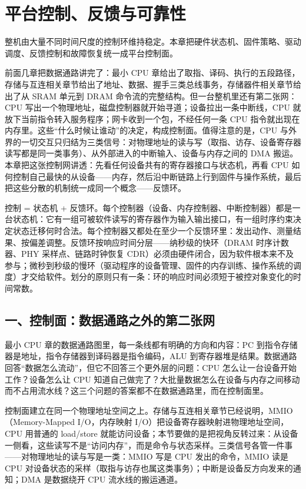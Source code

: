\chapter{平台控制、反馈与可靠性}

\begin{keyidea}
整机由大量不同时间尺度的控制环维持稳定。本章把硬件状态机、固件策略、驱动调度、反馈控制和故障恢复统一成平台控制面。
\end{keyidea}

前面几章把数据通路讲完了：最小 CPU 章给出了取指、译码、执行的五段路径，存储与互连相关章节给出了地址、数据、握手三类总线事务，存储器件相关章节给出了从 SRAM 单元到 DRAM 命令流的完整结构。但一台整机里还有第二张网：CPU 写出一个物理地址，磁盘控制器就开始寻道；设备拉出一条中断线，CPU 就放下当前指令转入服务程序；网卡收到一个包，不经任何一条 CPU 指令就出现在内存里。这些“什么时候让谁动”的决定，构成控制面。值得注意的是，CPU 与外界的一切交互只归结为三类信号：对物理地址的读与写（取指、访存、设备寄存器读写都是同一类事务）、从外部进入的中断输入、设备与内存之间的 DMA 搬运。本章把这张控制网讲透：先看任何设备共有的寄存器接口与状态机，再看 CPU 如何控制自己最快的从设备——内存，然后沿中断链路上行到固件与操作系统，最后把这些分散的机制统一成同一个概念——反馈环。

\begin{keyidea}
控制 = 状态机 + 反馈环。每个控制器（设备、内存控制器、中断控制器）都是一台状态机：它有一组可被软件读写的寄存器作为输入输出接口，有一组时序约束决定状态迁移何时合法。每个控制器又都处在至少一个反馈环里：发出动作、测量结果、按偏差调整。反馈环按响应时间分层——纳秒级的快环（DRAM 时序计数器、PHY 采样点、链路时钟恢复 CDR）必须由硬件闭合，因为软件根本来不及参与；微秒到秒级的慢环（驱动程序的设备管理、固件的内存训练、操作系统的调度）才交给软件。划分的原则只有一条：环的响应时间必须短于被控对象变化的时间常数。
\end{keyidea}

\section{一、控制面：数据通路之外的第二张网}

最小 CPU 章的数据通路图里，每一条线都有明确的方向和内容：PC 到指令存储器是地址，指令存储器到译码器是指令编码，ALU 到寄存器堆是结果。数据通路回答“数据怎么流动”，但它不回答三个更外层的问题：CPU 怎么让一台设备开始工作？设备怎么让 CPU 知道自己做完了？大批量数据怎么在设备与内存之间移动而不占用流水线？这三个问题的答案都不在数据通路里，而在控制面里。

控制面建立在同一个物理地址空间之上。存储与互连相关章节已经说明，MMIO（Memory-Mapped I/O，内存映射 I/O）把设备寄存器映射进物理地址空间，CPU 用普通的 load/store 就能访问设备；本节要做的是把视角反转过来：从设备一侧看，这些读写不是“访问内存”，而是命令与状态采样。三类信号各管一件事——对物理地址的读与写是一类：MMIO 写是 CPU 发出的命令，MMIO 读是 CPU 对设备状态的采样（取指与访存也属这类事务）；中断是设备反方向发来的通知；DMA 是数据绕开 CPU 流水线的搬运通道。

